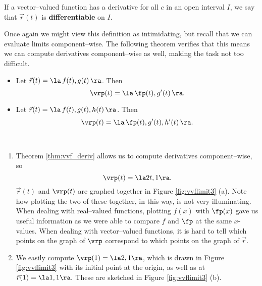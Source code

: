 If a vector--valued function  has a derivative for all $c$ in an open interval $I$, we say that $\vec r(t)$ is \textbf{differentiable} on $I$.

Once again we might view this definition as intimidating, but recall that we can evaluate limits component--wise. The following theorem verifies that this means we can compute derivatives component--wise as well, making the task not too difficult.
\enlargethispage{2\baselineskip}

{\begin{itemize}
	\item Let $\vec r(t) = \la \, f(t), g(t)\,\ra$. Then 
	$$\vrp(t) = \la\, \fp(t), g'(t)\, \ra.$$
	\item Let $\vec r(t) = \la \, f(t), g(t), h(t)\,\ra$. Then 
	$$\vrp(t) = \la\, \fp(t), g'(t), h'(t)\, \ra.$$
\end{itemize}
}\\

{\begin{enumerate}
\item	Theorem \ref{thm:vvf_deriv} allows us to compute derivatives component--wise, so
$$\vrp(t) = \la 2t, 1\ra.$$ $\vec r(t)$ and $\vrp(t)$ are graphed together in Figure \ref{fig:vvflimit3} (a). Note how plotting the two of these together, in this way, is not very illuminating. When dealing with real--valued functions, plotting $f(x)$ with $\fp(x)$ gave us useful information as we were able to compare $f$ and $\fp$ at the same $x$-values. When dealing with vector--valued functions, it is hard to tell which points on the graph of $\vrp$ correspond to which points on the graph of $\vec r$.

\item	We easily compute $\vrp(1) = \la 2,1\ra$, which is drawn in Figure \ref{fig:vvflimit3} with its initial point at the origin, as well as at $\vec r(1) = \la 1,1\ra.$ These are sketched in Figure \ref{fig:vvflimit3} (b).

\end{enumerate}
\baselineskip
}\\
\clearpage

